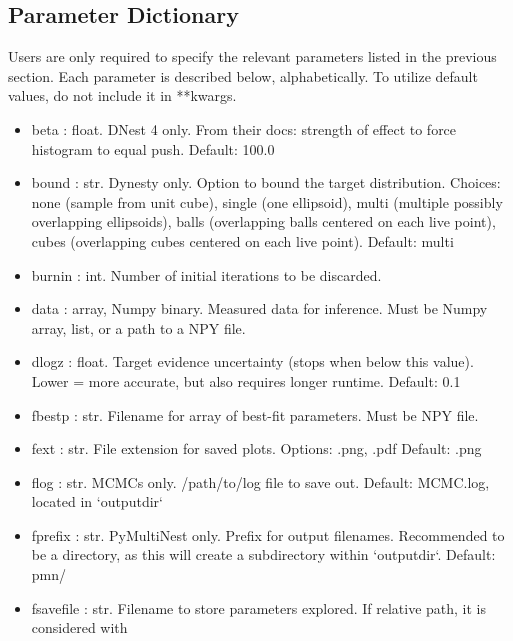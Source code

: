 \documentclass[letterpaper, 12pt]{article}
\begin{document}
\subsection{Parameter Dictionary}
\label{sec:param-desc}

Users are only required to specify the relevant parameters listed in 
the previous section.  Each parameter is described below, alphabetically.
To utilize default values, do not include it in **kwargs.

\begin{itemize}
\item beta : float. DNest 4 only. From their docs: strength of effect 
                    to force histogram to equal push.  Default: 100.0
\item bound : str. Dynesty only. Option to bound the target  
                   distribution. Choices: none (sample from unit  
                   cube), single (one ellipsoid), multi (multiple  
                   possibly overlapping ellipsoids), balls  
                   (overlapping balls centered on each live point),  
                   cubes (overlapping cubes centered on each live  
                   point).  Default: multi
\item burnin : int. Number of initial iterations to be discarded.
\item data : array, Numpy binary. Measured data for inference.  
                    Must be Numpy array, list, or a path to a NPY file.
\item dlogz : float. Target evidence uncertainty (stops when below  
                     this value).  Lower = more accurate, but also 
                     requires longer runtime. Default: 0.1
\item fbestp : str. Filename for array of best-fit parameters.  
                    Must be NPY file.
\item fext : str. File extension for saved plots.  
                  Options: .png, .pdf  Default: .png
\item flog : str. MCMCs only. /path/to/log file to save out.  
                  Default: MCMC.log, located in `outputdir`
\item fprefix : str. PyMultiNest only. Prefix for output filenames. 
                     Recommended to be a directory, as this will create 
                     a subdirectory within `outputdir`. Default: pmn/
\item fsavefile : str. Filename to store parameters explored.  
                            If relative path, it is considered with  

\end{itemize}
\end{document}
